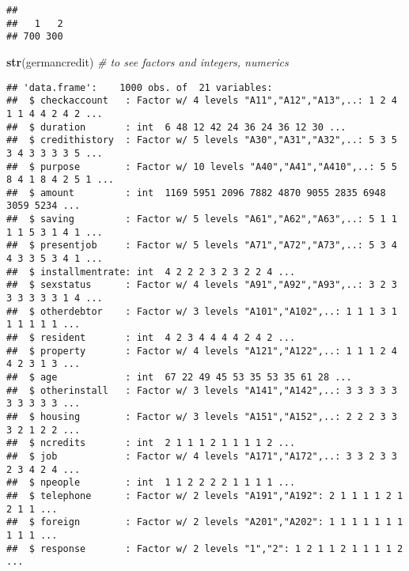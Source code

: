 \documentclass[]{article}
\newenvironment{Shaded}{\begin{snugshade}}{\end{snugshade}}
\newcommand{\KeywordTok}[1]{\textcolor[rgb]{0.13,0.29,0.53}{\textbf{#1}}}
\newcommand{\DataTypeTok}[1]{\textcolor[rgb]{0.13,0.29,0.53}{#1}}
\newcommand{\DecValTok}[1]{\textcolor[rgb]{0.00,0.00,0.81}{#1}}
\newcommand{\FloatTok}[1]{\textcolor[rgb]{0.00,0.00,0.81}{#1}}
\newcommand{\StringTok}[1]{\textcolor[rgb]{0.31,0.60,0.02}{#1}}
\newcommand{\CommentTok}[1]{\textcolor[rgb]{0.56,0.35,0.01}{\textit{#1}}}
\newcommand{\OtherTok}[1]{\textcolor[rgb]{0.56,0.35,0.01}{#1}}
\newcommand{\OperatorTok}[1]{\textcolor[rgb]{0.81,0.36,0.00}{\textbf{#1}}}
\newcommand{\NormalTok}[1]{#1}
\begin{document}
\begin{verbatim}
## 
##   1   2 
## 700 300
\end{verbatim}

\begin{Shaded}
\begin{Highlighting}[]
\KeywordTok{str}\NormalTok{(germancredit)  }\CommentTok{# to see factors and integers, numerics}
\end{Highlighting}
\end{Shaded}

\begin{verbatim}
## 'data.frame':    1000 obs. of  21 variables:
##  $ checkaccount   : Factor w/ 4 levels "A11","A12","A13",..: 1 2 4 1 1 4 4 2 4 2 ...
##  $ duration       : int  6 48 12 42 24 36 24 36 12 30 ...
##  $ credithistory  : Factor w/ 5 levels "A30","A31","A32",..: 5 3 5 3 4 3 3 3 3 5 ...
##  $ purpose        : Factor w/ 10 levels "A40","A41","A410",..: 5 5 8 4 1 8 4 2 5 1 ...
##  $ amount         : int  1169 5951 2096 7882 4870 9055 2835 6948 3059 5234 ...
##  $ saving         : Factor w/ 5 levels "A61","A62","A63",..: 5 1 1 1 1 5 3 1 4 1 ...
##  $ presentjob     : Factor w/ 5 levels "A71","A72","A73",..: 5 3 4 4 3 3 5 3 4 1 ...
##  $ installmentrate: int  4 2 2 2 3 2 3 2 2 4 ...
##  $ sexstatus      : Factor w/ 4 levels "A91","A92","A93",..: 3 2 3 3 3 3 3 3 1 4 ...
##  $ otherdebtor    : Factor w/ 3 levels "A101","A102",..: 1 1 1 3 1 1 1 1 1 1 ...
##  $ resident       : int  4 2 3 4 4 4 4 2 4 2 ...
##  $ property       : Factor w/ 4 levels "A121","A122",..: 1 1 1 2 4 4 2 3 1 3 ...
##  $ age            : int  67 22 49 45 53 35 53 35 61 28 ...
##  $ otherinstall   : Factor w/ 3 levels "A141","A142",..: 3 3 3 3 3 3 3 3 3 3 ...
##  $ housing        : Factor w/ 3 levels "A151","A152",..: 2 2 2 3 3 3 2 1 2 2 ...
##  $ ncredits       : int  2 1 1 1 2 1 1 1 1 2 ...
##  $ job            : Factor w/ 4 levels "A171","A172",..: 3 3 2 3 3 2 3 4 2 4 ...
##  $ npeople        : int  1 1 2 2 2 2 1 1 1 1 ...
##  $ telephone      : Factor w/ 2 levels "A191","A192": 2 1 1 1 1 2 1 2 1 1 ...
##  $ foreign        : Factor w/ 2 levels "A201","A202": 1 1 1 1 1 1 1 1 1 1 ...
##  $ response       : Factor w/ 2 levels "1","2": 1 2 1 1 2 1 1 1 1 2 ...
\end{verbatim}

\begin{Shaded}
\end{Shaded}
\end{document}
